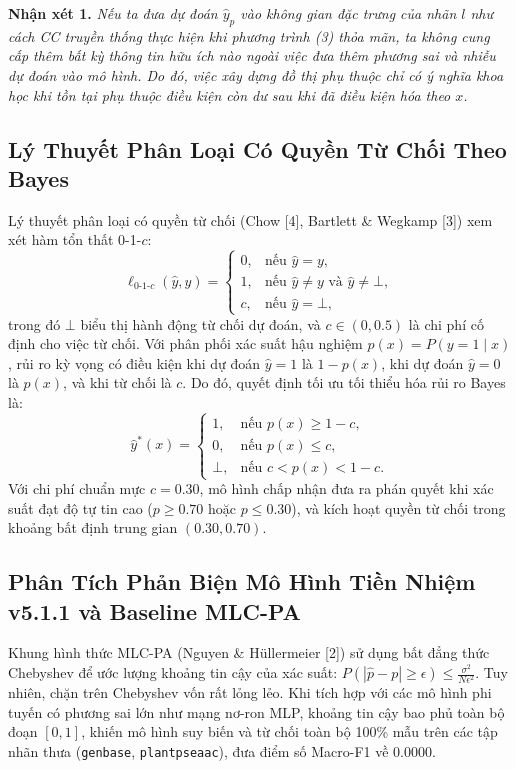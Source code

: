 \documentclass[10pt,a4paper,twoside]{article}
\begin{document}
\vspace{0.3em}
\noindent\textbf{Nhận xét 1.} \textit{Nếu ta đưa dự đoán $\hat{y}_p$ vào không gian đặc trưng của nhãn $l$ như cách CC truyền thống thực hiện khi phương trình (3) thỏa mãn, ta không cung cấp thêm bất kỳ thông tin hữu ích nào ngoài việc đưa thêm phương sai và nhiễu dự đoán vào mô hình. Do đó, việc xây dựng đồ thị phụ thuộc chỉ có ý nghĩa khoa học khi tồn tại phụ thuộc điều kiện còn dư sau khi đã điều kiện hóa theo $x$.}
\vspace{0.3em}

\subsection{Lý Thuyết Phân Loại Có Quyền Từ Chối Theo Bayes}
Lý thuyết phân loại có quyền từ chối (Chow [4], Bartlett \& Wegkamp [3]) xem xét hàm tổn thất 0-1-$c$:
\begin{equation}
\ell_{0\text{-}1\text{-}c}(\hat{y}, y) = \begin{cases}
0, & \text{nếu } \hat{y} = y, \\
1, & \text{nếu } \hat{y} \neq y \text{ và } \hat{y} \neq \bot, \\
c, & \text{nếu } \hat{y} = \bot,
\end{cases}
\end{equation}
trong đó $\bot$ biểu thị hành động từ chối dự đoán, và $c \in (0, 0.5)$ là chi phí cố định cho việc từ chối. Với phân phối xác suất hậu nghiệm $p(x) = P(y = 1 \mid x)$, rủi ro kỳ vọng có điều kiện khi dự đoán $\hat{y} = 1$ là $1 - p(x)$, khi dự đoán $\hat{y} = 0$ là $p(x)$, và khi từ chối là $c$. Do đó, quyết định tối ưu tối thiểu hóa rủi ro Bayes là:
\begin{equation}
\hat{y}^*(x) = \begin{cases}
1, & \text{nếu } p(x) \ge 1 - c, \\
0, & \text{nếu } p(x) \le c, \\
\bot, & \text{nếu } c < p(x) < 1 - c.
\end{cases}
\end{equation}
Với chi phí chuẩn mực $c = 0.30$, mô hình chấp nhận đưa ra phán quyết khi xác suất đạt độ tự tin cao ($p \ge 0.70$ hoặc $p \le 0.30$), và kích hoạt quyền từ chối trong khoảng bất định trung gian $(0.30, 0.70)$.

\subsection{Phân Tích Phản Biện Mô Hình Tiền Nhiệm v5.1.1 và Baseline MLC-PA}
Khung hình thức MLC-PA (Nguyen \& Hüllermeier [2]) sử dụng bất đẳng thức Chebyshev để ước lượng khoảng tin cậy của xác suất:
$P(|\hat{p} - p| \ge \epsilon) \le \frac{\sigma^2}{N\epsilon^2}$.
Tuy nhiên, chặn trên Chebyshev vốn rất lỏng lẻo. Khi tích hợp với các mô hình phi tuyến có phương sai lớn như mạng nơ-ron MLP, khoảng tin cậy bao phủ toàn bộ đoạn $[0, 1]$, khiến mô hình suy biến và từ chối toàn bộ 100\% mẫu trên các tập nhãn thưa (\texttt{genbase}, \texttt{plantpseaac}), đưa điểm số Macro-F1 về $0.0000$.
\end{document}
